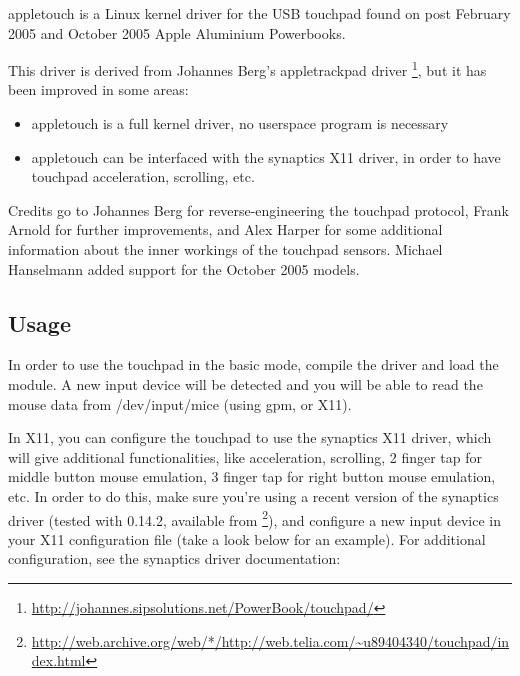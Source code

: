 \documentclass[a4paper,8pt,english]{sphinxmanual}
\begin{document}
appletouch is a Linux kernel driver for the USB touchpad found on post
February 2005 and October 2005 Apple Aluminium Powerbooks.

This driver is derived from Johannes Berg's appletrackpad driver \footnote[1]{
\href{http://johannes.sipsolutions.net/PowerBook/touchpad/}{http://johannes.sipsolutions.net/PowerBook/touchpad/}
},
but it has been improved in some areas:
\begin{itemize}
\item {} 
appletouch is a full kernel driver, no userspace program is necessary

\item {} 
appletouch can be interfaced with the synaptics X11 driver, in order
to have touchpad acceleration, scrolling, etc.

\end{itemize}

Credits go to Johannes Berg for reverse-engineering the touchpad protocol,
Frank Arnold for further improvements, and Alex Harper for some additional
information about the inner workings of the touchpad sensors. Michael
Hanselmann added support for the October 2005 models.


\subsection{Usage}
\label{input/devices/appletouch:usage}
In order to use the touchpad in the basic mode, compile the driver and load
the module. A new input device will be detected and you will be able to read
the mouse data from /dev/input/mice (using gpm, or X11).

In X11, you can configure the touchpad to use the synaptics X11 driver, which
will give additional functionalities, like acceleration, scrolling, 2 finger
tap for middle button mouse emulation, 3 finger tap for right button mouse
emulation, etc. In order to do this, make sure you're using a recent version of
the synaptics driver (tested with 0.14.2, available from \footnote[2]{
\href{http://web.archive.org/web/*/http://web.telia.com/~u89404340/touchpad/index.html}{http://web.archive.org/web/*/http://web.telia.com/\textasciitilde{}u89404340/touchpad/index.html}
}), and configure
a new input device in your X11 configuration file (take a look below for an
example). For additional configuration, see the synaptics driver documentation:
\end{document}
